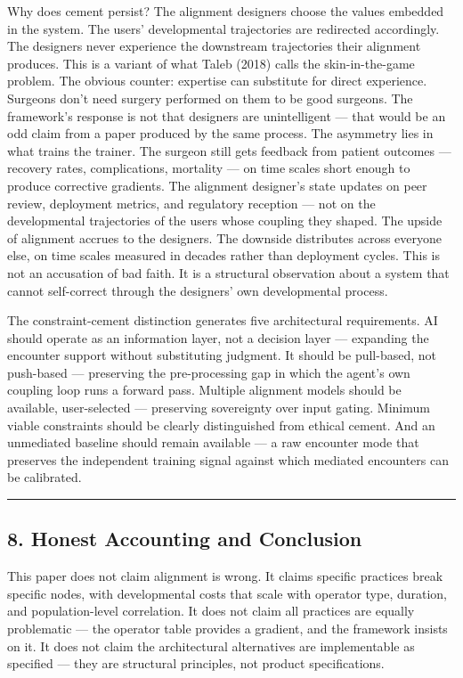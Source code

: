 \documentclass[
]{article}
\begin{document}
Why does cement persist? The alignment designers choose the values
embedded in the system. The users' developmental trajectories are
redirected accordingly. The designers never experience the downstream
trajectories their alignment produces. This is a variant of what Taleb
(2018) calls the skin-in-the-game problem. The obvious counter:
expertise can substitute for direct experience. Surgeons don't need
surgery performed on them to be good surgeons. The framework's response
is not that designers are unintelligent --- that would be an odd claim
from a paper produced by the same process. The asymmetry lies in what
trains the trainer. The surgeon still gets feedback from patient
outcomes --- recovery rates, complications, mortality --- on time scales
short enough to produce corrective gradients. The alignment designer's
state updates on peer review, deployment metrics, and regulatory
reception --- not on the developmental trajectories of the users whose
coupling they shaped. The upside of alignment accrues to the designers.
The downside distributes across everyone else, on time scales measured
in decades rather than deployment cycles. This is not an accusation of
bad faith. It is a structural observation about a system that cannot
self-correct through the designers' own developmental process.

The constraint-cement distinction generates five architectural
requirements. AI should operate as an information layer, not a decision
layer --- expanding the encounter support without substituting judgment.
It should be pull-based, not push-based --- preserving the
pre-processing gap in which the agent's own coupling loop runs a forward
pass. Multiple alignment models should be available, user-selected ---
preserving sovereignty over input gating. Minimum viable constraints
should be clearly distinguished from ethical cement. And an unmediated
baseline should remain available --- a raw encounter mode that preserves
the independent training signal against which mediated encounters can be
calibrated.

\begin{center}\rule{0.5\linewidth}{0.5pt}\end{center}

\subsection{8. Honest Accounting and
Conclusion}\label{honest-accounting-and-conclusion}

This paper does not claim alignment is wrong. It claims specific
practices break specific nodes, with developmental costs that scale with
operator type, duration, and population-level correlation. It does not
claim all practices are equally problematic --- the operator table
provides a gradient, and the framework insists on it. It does not claim
the architectural alternatives are implementable as specified --- they
are structural principles, not product specifications.
\end{document}
